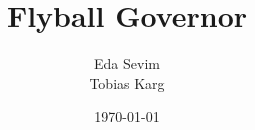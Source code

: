 \title{Flyball Governor}   
\author{Eda Sevim \\ Tobias Karg} 
\date{\today}
\begin{frame}
	\titlepage
\end{frame}
